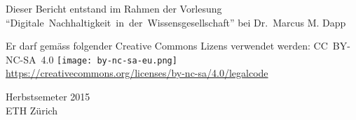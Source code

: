 \begin{titlepage}
\begin{large}
\begin{center}
			Dieser Bericht entstand im Rahmen der Vorlesung \mbox{``Digitale Nachhaltigkeit in der Wissensgesellschaft''} bei Dr.\ Marcus M. Dapp \\
			\vspace{2\baselineskip}
	
			Er darf gemäss folgender Creative Commons Lizens verwendet werden: \mbox{CC BY-NC-SA 4.0} \texttt{[image: by-nc-sa-eu.png]}\\ \url{https://creativecommons.org/licenses/by-nc-sa/4.0/legalcode} \\
			\vfill
	
			Herbstsemeter 2015 \\
			\vspace{0.5\baselineskip}
			ETH Zürich
		\end{center}
	\end{large}
\end{titlepage}